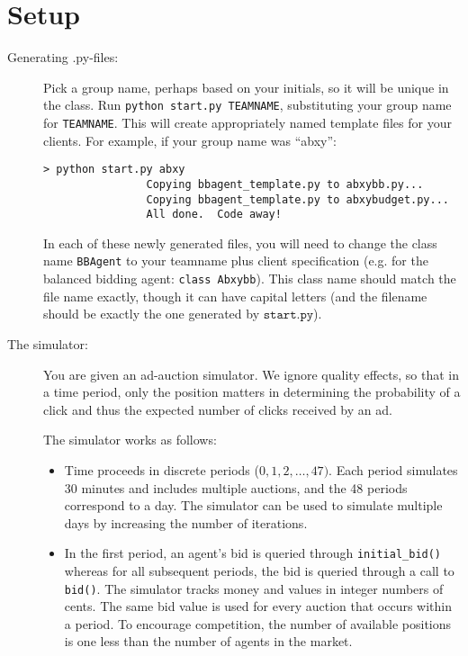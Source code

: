 \documentclass[11pt]{article}
\begin{document}
\section{Setup}
	\begin{description}

		\item[Generating .py-files:] Pick a group name, perhaps based on your initials, so it will be unique in the class. Run \verb+python start.py TEAMNAME+, substituting your group name for \verb+TEAMNAME+. This will create appropriately named template files for your clients. For example, if your group name was ``abxy'':
			\begin{verbatim}> python start.py abxy
				Copying bbagent_template.py to abxybb.py...
				Copying bbagent_template.py to abxybudget.py...
				All done.  Code away!
			\end{verbatim}
			In each of these newly generated files, you will need to change the class name \verb+BBAgent+  to your teamname plus client specification (e.g. for the balanced bidding agent: \verb+class Abxybb+). This class name should match the file name exactly, though it can have capital letters (and the filename should be exactly the one generated by $\texttt{start.py}$).
	
                      \item[The simulator:] You are given an
                        ad-auction simulator.  We ignore quality
                        effects, so that in a time period, only the
                        position matters in determining the
                        probability of a click and thus the expected
                        number of clicks received by an ad.

The simulator works as follows:
%
			\begin{itemize}
				\item Time proceeds in discrete periods ($0, 1, 2, \ldots, 47)$. Each period simulates 30 minutes and includes multiple auctions,
and the 48 periods correspond to a day. The simulator can be used to simulate
multiple days by increasing the number of iterations.

				\item In the first period, an agent's
                                  bid is queried through
                                  \verb+initial_bid()+ whereas for all
                                  subsequent periods, the bid is
                                  queried through a call to
                                  \verb+bid()+. The simulator tracks
                                  money and values in integer numbers
                                  of cents.
The same bid value is used for every auction that
occurs within a period. 
To encourage competition, the number of available positions is one less than
the number of agents in the market.


\end{itemize}
\end{description}
\end{document}
